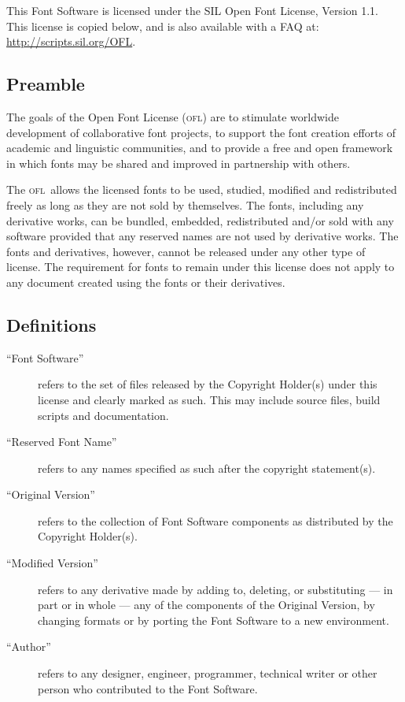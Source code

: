 This Font Software is licensed under the SIL Open Font
License, Version 1.1.  This license is copied below, and is
also available with a FAQ at:
\url{http://scripts.sil.org/OFL}.

\def\ofl{\textsc{ofl}}

\subsection*{Preamble}
\label{sil:preamble}

The goals of the Open Font License (\ofl) are to stimulate
worldwide development of collaborative font projects, to
support the font creation efforts of academic and linguistic
communities, and to provide a free and open framework in
which fonts may be shared and improved in partnership with
others.

The \ofl\ allows the licensed fonts to be used, studied,
modified and redistributed freely as long as they are not
sold by themselves. The fonts, including any derivative
works, can be bundled, embedded, redistributed and/or sold
with any software provided that any reserved names are not
used by derivative works. The fonts and derivatives,
however, cannot be released under any other type of license.
The requirement for fonts to remain under this license does
not apply to any document created using the fonts or their
derivatives.

\subsection*{Definitions}
\label{sil:definitions}

\def\silterm#1{\noindent``#1''}

\begin{description}
\item[\silterm{Font Software}] refers to the set of files released
by the Copyright Holder(s) under this license and clearly
marked as such. This may include source files, build scripts
and documentation.

\item[\silterm{Reserved Font Name}] refers to any names specified
as such after the copyright statement(s).

\item[\silterm{Original Version}] refers to the collection of Font
Software components as distributed by the Copyright
Holder(s).

\item[\silterm{Modified Version}] refers to any derivative made by
adding to, deleting, or substituting --- in part or in whole
--- any of the components of the Original Version, by
changing formats or by porting the Font Software to a new
environment.

\item[\silterm{Author}] refers to any designer, engineer,
programmer, technical writer or other person who contributed
to the Font Software.
\end{description}

